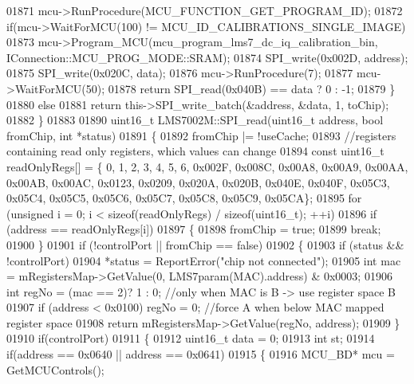 \begin{DoxyCode}
{{{{{{{{{{{{{{{{{{{{{{{{{{{{{{{{{{{{{{{{{{{{{{{{{{{{{{{01871         mcu->RunProcedure(MCU_FUNCTION_GET_PROGRAM_ID);
01872         \textcolor{keywordflow}{if}(mcu->WaitForMCU(100) != MCU_ID_CALIBRATIONS_SINGLE_IMAGE)
01873             mcu->Program_MCU(mcu_program_lms7_dc_iq_calibration_bin, IConnection::MCU\_PROG\_MODE::SRAM);
01874         SPI_write(0x002D, address);
01875         SPI_write(0x020C, data);
01876         mcu->RunProcedure(7);
01877         mcu->WaitForMCU(50);
01878         \textcolor{keywordflow}{return} SPI_read(0x040B) == data ? 0 : -1;
01879     \}
01880     \textcolor{keywordflow}{else}
01881         \textcolor{keywordflow}{return} this->SPI_write_batch(&address, &data, 1, toChip);
01882 \}
01883 
01890 uint16\_t LMS7002M::SPI_read(uint16\_t address, \textcolor{keywordtype}{bool} fromChip, \textcolor{keywordtype}{int} *status)
01891 \{
01892     fromChip |= !useCache;
01893     \textcolor{comment}{//registers containing read only registers, which values can change}
01894     \textcolor{keyword}{const} uint16\_t readOnlyRegs[] = \{ 0, 1, 2, 3, 4, 5, 6, 0x002F, 0x008C, 0x00A8, 0x00A9, 0x00AA, 0x00AB, 
      0x00AC, 0x0123, 0x0209, 0x020A, 0x020B, 0x040E, 0x040F, 0x05C3, 0x05C4, 0x05C5, 0x05C6, 0x05C7, 0x05C8, 
      0x05C9, 0x05CA\};
01895     \textcolor{keywordflow}{for} (\textcolor{keywordtype}{unsigned} i = 0; i < \textcolor{keyword}{sizeof}(readOnlyRegs) / \textcolor{keyword}{sizeof}(uint16\_t); ++i)
01896         \textcolor{keywordflow}{if} (address == readOnlyRegs[i])
01897         \{
01898             fromChip = \textcolor{keyword}{true};
01899             \textcolor{keywordflow}{break};
01900         \}
01901     \textcolor{keywordflow}{if} (!controlPort || fromChip == \textcolor{keyword}{false})
01902     \{
01903         \textcolor{keywordflow}{if} (status && !controlPort)
01904             *status = ReportError(\textcolor{stringliteral}{"chip not connected"});
01905         \textcolor{keywordtype}{int} mac = mRegistersMap->GetValue(0, LMS7param(MAC).address) & 0x0003;
01906         \textcolor{keywordtype}{int} regNo = (mac == 2)? 1 : 0; \textcolor{comment}{//only when MAC is B -> use register space B}
01907         \textcolor{keywordflow}{if} (address < 0x0100) regNo = 0; \textcolor{comment}{//force A when below MAC mapped register space}
01908         \textcolor{keywordflow}{return} mRegistersMap->GetValue(regNo, address);
01909     \}
01910     \textcolor{keywordflow}{if}(controlPort)
01911     \{
01912         uint16\_t data = 0;
01913         \textcolor{keywordtype}{int} st;
01914         \textcolor{keywordflow}{if}(address == 0x0640 || address == 0x0641)
01915         \{
01916             MCU_BD* mcu = GetMCUControls();
}}}}}}}}}}}}}}}}}}}}}}}}}}}}}}}}}}}}}}}}}}}}}}}}}}}}}}}
\end{DoxyCode}
